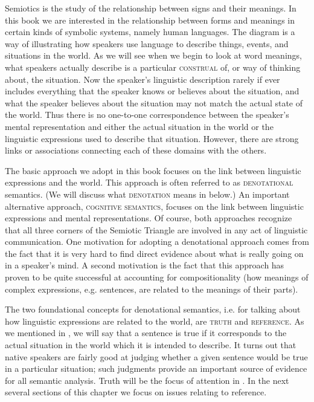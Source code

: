 Semiotics is the study of the relationship between signs and their meanings. In this book we are interested in the relationship between forms and meanings in certain kinds of symbolic systems, namely human languages. The diagram is a way of illustrating how speakers use language to describe things, events, and situations in the world. As we will see when we begin to look at word meanings, what speakers actually describe is a particular \textsc{construal} of, or way of thinking about, the situation. Now the speaker’s linguistic description rarely if ever includes everything that the speaker knows or believes about the situation, and what the speaker believes about the situation may not match the actual state of the world. Thus there is no one-to-one correspondence between the speaker’s mental representation and either the actual situation in the world or the linguistic expressions used to describe that situation. However, there are strong links or associations connecting each of these domains with the others.



The basic approach we adopt in this book focuses on the link between linguistic expressions and the world. This approach is often referred to as \textsc{denotational} semantics. (We will discuss what \textsc{denotation} means in  below.) An important alternative approach, \textsc{cognitive semantics}, focuses on the link between linguistic expressions and mental representations. Of course, both approaches recognize that all three corners of the Semiotic Triangle are involved in any act of linguistic communication. One motivation for adopting a denotational approach comes from the fact that it is very hard to find direct evidence about what is really going on in a speaker’s mind. A second motivation is the fact that this approach has proven to be quite successful at accounting for compositionality (how meanings of complex expressions, e.g. sentences, are related to the meanings of their parts).



The two foundational concepts for denotational semantics, i.e. for talking about how linguistic expressions are related to the world, are \textsc{truth} and \textsc{reference}. As we mentioned in , we will say that a sentence is true if it corresponds to the actual situation in the world which it is intended to describe. It turns out that native speakers are fairly good at judging whether a given sentence would be true in a particular situation; such judgments provide an important source of evidence for all semantic analysis. Truth will be the focus of attention in . In the next several sections of this chapter we focus on issues relating to reference.


